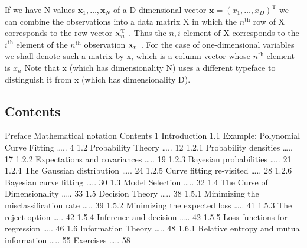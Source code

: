 \documentclass[
  10
]{article}
\begin{document}
If we have N values
\(\mathbf { x } _ { 1 } , \ldots , \mathbf { x } _ { N }\) of a
D-dimensional vector
\(\mathbf x = ( x _ { 1 } , \dots , x _ { D } ) ^ { \mathrm T }\) we can
combine the observations into a data matrix X in which the
\(n ^ { \mathrm { t h } }\) row of X corresponds to the row vector
\({ \bf x } _ { n } ^ { \mathrm { T } }\) . Thus the \(n , i\) element
of X corresponds to the \(i ^ { \mathrm { t h } }\) element of the
\(n ^ { \mathrm { t h } }\) observation \({ \bf x } _ { n }\) . For the
case of one-dimensional variables we shall denote such a matrix by x,
which is a column vector whose \(n ^ { \mathrm { t h } }\) element is
\(x _ { n }\) Note that x (which has dimensionality N) uses a different
typeface to distinguish it from x (which has dimensionality D).

\subsection{Contents}\label{contents}

Preface Mathematical notation Contents 1 Introduction 1.1 Example:
Polynomial Curve Fitting \ldots.. 4 1.2 Probability Theory \ldots.. 12
1.2.1 Probability densities \ldots.. 17 1.2.2 Expectations and
covariances \ldots.. 19 1.2.3 Bayesian probabilities \ldots.. 21 1.2.4
The Gaussian distribution \ldots.. 24 1.2.5 Curve fitting re-visited
\ldots.. 28 1.2.6 Bayesian curve fitting \ldots.. 30 1.3 Model Selection
\ldots.. 32 1.4 The Curse of Dimensionality \ldots.. 33 1.5 Decision
Theory \ldots.. 38 1.5.1 Minimizing the misclassification rate \ldots..
39 1.5.2 Minimizing the expected loss \ldots.. 41 1.5.3 The reject
option \ldots.. 42 1.5.4 Inference and decision \ldots.. 42 1.5.5 Loss
functions for regression \ldots.. 46 1.6 Information Theory \ldots.. 48
1.6.1 Relative entropy and mutual information \ldots.. 55 Exercises
\ldots.. 58
\end{document}
